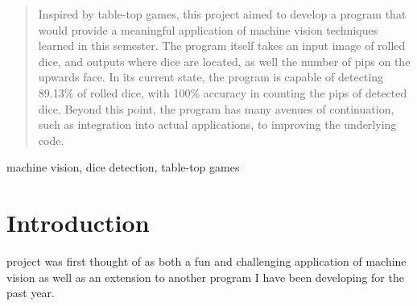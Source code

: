 \documentclass[journal]{IEEEtran}
\begin{document}







\maketitle

\begin{abstract}
Inspired by table-top games, this project aimed to develop a program that would provide a meaningful application of machine vision techniques learned in this semester. The program itself takes an input image of rolled dice, and outputs where dice are located, as well the number of pips on the upwards face. In its current state, the program is capable of detecting 89.13\% of rolled dice, with 100\% accuracy in counting the pips of detected dice. Beyond this point, the program has many avenues of continuation, such as integration into actual applications, to improving the underlying code.
\end{abstract}

\begin{IEEEkeywords}
machine vision, dice detection, table-top games
\end{IEEEkeywords}

%
\IEEEpeerreviewmaketitle



\section{Introduction}
% 
% 
% 
% 
 project was first thought of as both a fun and challenging application of machine vision as well as an extension to another program I have been developing for the past year.\\
\end{document}
